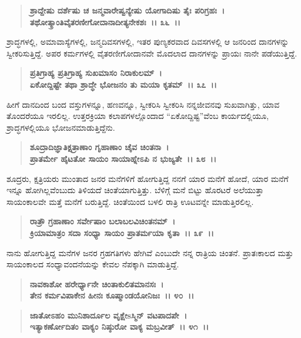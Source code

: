 \begin{verse}
\textbf{ಶ್ರಾದ್ದೇಷು ದರ್ಶೆಷು ಚ ಜನ್ಮವಾರೇಷ್ವನ್ಯೇಷು ಯೋಗಾದಿಷು ತೈಃ ಪರಿಗ್ರಹಃ~।}\\\textbf{ತಥೋತ್ಕ್ರಾಂತಿವೈತರಣೀಗೋದಾನಾದೀತ್ಯನೇಕಶಃ~।। ೩೬~।।}
\end{verse}

ಶ್ರಾದ್ಧಗಳಲ್ಲಿ, ಅಮಾವಾಸ್ಯೆಗಳಲ್ಲಿ, ಜನ್ಮದಿವಸಗಳಲ್ಲಿ, ಇತರ ಪುಣ್ಯಕರವಾದ ದಿವಸಗಳಲ್ಲಿ ಆ ಜನರಿಂದ ದಾನಗಳನ್ನು ಸ್ವೀಕರಿಸುತ್ತಿದ್ದೆ. ಅಪರ ಕರ್ಮಗಳಲ್ಲಿ ವೈತರಣೀಗೋದಾನವೇ ಮೊದಲಾದ ದಾನಗಳನ್ನು ಪ್ರಾಯಃ ನಾನೇ ಪಡೆಯುತ್ತಿದ್ದೆ.

\begin{verse}
\textbf{ಪ್ರತಿಗ್ರಾಹ್ಯ ಪ್ರತಿಗ್ರಾಹ್ಯ ಸುಖಮಾಸಂ ನಿರಾಕುಲಮ್~।}\\\textbf{ಏಕೋದ್ದಿಷ್ಟೇ ತಥಾ ಶ್ರಾದ್ಧೇ ಭೋಜನಂ ತು ಮಯಾ ಕೃತಮ್~।। ೩೭~।।}
\end{verse}

ಹೀಗೆ ದಾನದಿಂದ ಬಂದ ವಸ್ತುಗಳನ್ನೂ, ಹಣವನ್ನೂ, ಸ್ವೀಕರಿಸಿ ಸ್ವೀಕರಿಸಿ ನನ್ನ\break ಜೀವನವು ಸುಖವಾಗಿತ್ತು, ಯಾವ ತೊಂದರೆಯೂ ಇರಲಿಲ್ಲ. ಉತ್ತರಕ್ರಿಯಾ ಕಲಾಪಗಳಲ್ಲೊಂದಾದ “ಏಕೋದ್ದಿಷ್ಟ”ವೆಂಬ ಕಾರ್ಯದಲ್ಲಿಯೂ, ಶ್ರಾದ್ಧಗಳಲ್ಲಿಯೂ ಭೋಜನಮಾಡುತ್ತಿದ್ದೆನು.

\begin{verse}
\textbf{ಶೂದ್ರಾದಿಜ್ಞಾತಿಕ್ಷತ್ರಾಣಾಂ ಗೃಹಾಣಾಂ ಚೈವ ಚಿಂತನಾ~।}\\\textbf{ಪ್ರಾತರ್ಮೇ ಹೈಟತೋ ಸಾಯಂ ಸಾಯಾಹ್ನೇಽಪಿ ನ ಭುಜ್ಯತೇ~।। ೩೮~।।}
\end{verse}

ಶೂದ್ರರು, ಕ್ಷತ್ರಿಯರು ಮುಂತಾದ ಜನರ ಮನೆಗಳಿಗೆ ಹೋಗುತ್ತಿದ್ದ ನನಗೆ ಯಾರ ಮನೆಗೆ ಹೋದೆ, ಯಾರ ಮನೆಗೆ ಇನ್ನೂ ಹೋಗಿಲ್ಲವೆಂಬುದು ತಿಳಿಯದೆ ಚಿಂತೆಯಾಗುತ್ತಿತ್ತು. ಬೆಳಿಗ್ಗೆ ಮನೆ ಬಿಟ್ಟು ಹೊರಟರೆ ಅಲೆಯುತ್ತಾ ಸಾಯಂಕಾಲವೇ ಮತ್ತೆ ಮನೆಗೆ ಬರುತ್ತಿದ್ದೆ. ಚಿಂತೆಯಿಂದ ಬಳಲಿ ರಾತ್ರಿ ಊಟವನ್ನೇ ಮಾಡುತ್ತಿರಲಿಲ್ಲ.

\begin{verse}
\textbf{ರಾತ್ರೌ ಗ್ರಹಾಣಾಂ ಸರ್ವೇಷಾಂ ಬಲಾಬಲವಿಚಿಂತನಮ್~।}\\\textbf{ಕ್ರಿಯಾಮಾತ್ರಂ ಸದಾ ಸಂಧ್ಯಾ ಸಾಯಂ ಪ್ರಾತರ್ಮಯಾ ಕೃತಾ~।। ೩೯~।।}
\end{verse}

ನಾನು ಹೋಗುತ್ತಿದ್ದ ಮನೆಗಳ ಜನರ ಗ್ರಹಗತಿಗಳು ಹೇಗಿವೆ ಎಂಬುದೇ ನನ್ನ ರಾತ್ರಿಯ ಚಿಂತನೆ. ಪ್ರಾತಃಕಾಲದ ಮತ್ತು ಸಾಯಂಕಾಲದ ಸಂಧ್ಯಾವಂದನೆಯನ್ನು ಕೇವಲ ನೆಪಕ್ಕಾಗಿ ಮಾಡುತ್ತಿದ್ದೆ.

\begin{verse}
\textbf{ನಾವಕಾಶೋ ಹರೇರ್ಧ್ಯಾನೇ ಚಿಂತಾಕುಲಿತಮಾನಸಃ~।}\\\textbf{ತೇನ ಕರ್ಮವಿಪಾಕೇನ ಹೀನಃ ಕೂಷ್ಮಾಂಡಯೋನಿಜಃ~।। ೪೦~।। }
\end{verse}

\begin{verse}
\textbf{ಜಾತೋಽಹಂ ಮುನಿಶಾರ್ದೂಲ ವೃಕ್ಷೇsಸ್ಮಿನ್ ವಟಪಾದಪೇ~।}\\\textbf{ಇತ್ಯಾಕರ್ಣೋದಿತಂ ವಾಕ್ಯಂ ನಿಷ್ಠುರೋ ವಾಕ್ಯ ಮಬ್ರವೀತ್~।। ೪೧~।।}
\end{verse}

